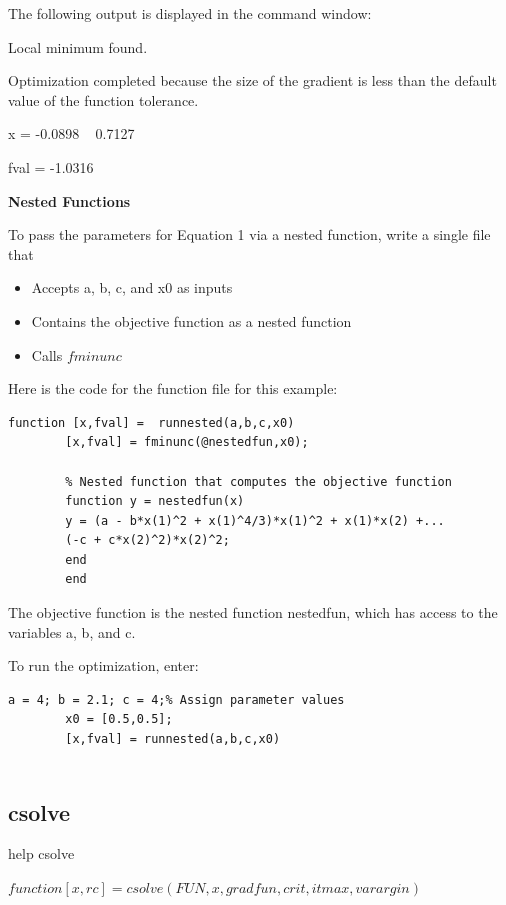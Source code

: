 \documentclass[10pt,math=newtx,citestyle=gb7714-2015,bibstyle=gb7714-2015]{elegantbook}
\begin{document}
{{{	The following output is displayed in the command window:
	
	Local minimum found.
	
	Optimization completed because the size of the gradient is less than the default value of the function tolerance.
	
	x =
	-0.0898  ~  0.7127
	
	fval =
	-1.0316
	
	\textbf{Nested Functions}   
	
	To pass the parameters for Equation 1 via a nested function, write a single file that
	
	\begin{itemize}
		\item Accepts a, b, c, and x0 as inputs
		
		\item Contains the objective function as a nested function
		
		\item Calls $fminunc$
	\end{itemize}
	
	Here is the code for the function file for this example:
	
	
	\begin{lstlisting}[frame=shadowbox]
		function [x,fval] =  runnested(a,b,c,x0)
		[x,fval] = fminunc(@nestedfun,x0);
		
		% Nested function that computes the objective function
		function y = nestedfun(x)
		y = (a - b*x(1)^2 + x(1)^4/3)*x(1)^2 + x(1)*x(2) +...
		(-c + c*x(2)^2)*x(2)^2;
		end
		end
	\end{lstlisting}
	
	The objective function is the nested function nestedfun, which has access to the variables a, b, and c.
	
	To run the optimization, enter:
	
	\begin{lstlisting}[frame=shadowbox]
		a = 4; b = 2.1; c = 4;% Assign parameter values
		x0 = [0.5,0.5];
		[x,fval] = runnested(a,b,c,x0)
		
	\end{lstlisting}
	
	\subsection{csolve}
	
	help csolve
	
	$function [x,rc] = csolve(FUN,x,gradfun,crit,itmax,varargin)$
	
}}}
\end{document}

